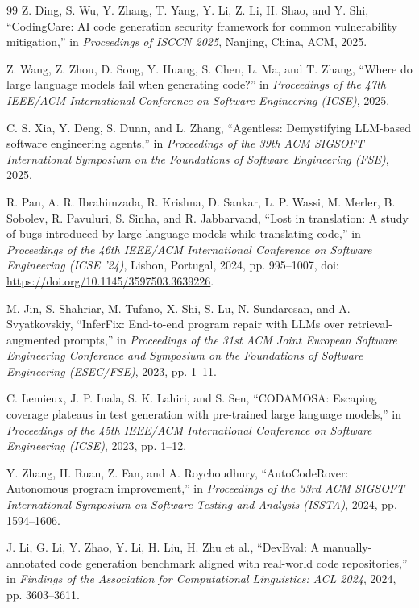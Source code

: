 \documentclass[10pt,a4paper]{article}
\begin{document}
\begin{thebibliography}{99}
Z. Ding, S. Wu, Y. Zhang, T. Yang, Y. Li, Z. Li, H. Shao, and Y. Shi, ``CodingCare: AI code generation security framework for common vulnerability mitigation,'' in \textit{Proceedings of ISCCN 2025}, Nanjing, China, ACM, 2025.

Z. Wang, Z. Zhou, D. Song, Y. Huang, S. Chen, L. Ma, and T. Zhang, ``Where do large language models fail when generating code?'' in \textit{Proceedings of the 47th IEEE/ACM International Conference on Software Engineering (ICSE)}, 2025.

C. S. Xia, Y. Deng, S. Dunn, and L. Zhang, ``Agentless: Demystifying LLM-based software engineering agents,'' in \textit{Proceedings of the 39th ACM SIGSOFT International Symposium on the Foundations of Software Engineering (FSE)}, 2025.

R. Pan, A. R. Ibrahimzada, R. Krishna, D. Sankar, L. P. Wassi, M. Merler, B. Sobolev, R. Pavuluri, S. Sinha, and R. Jabbarvand, ``Lost in translation: A study of bugs introduced by large language models while translating code,'' in \textit{Proceedings of the 46th IEEE/ACM International Conference on Software Engineering (ICSE '24)}, Lisbon, Portugal, 2024, pp. 995--1007, doi: \url{https://doi.org/10.1145/3597503.3639226}.

M. Jin, S. Shahriar, M. Tufano, X. Shi, S. Lu, N. Sundaresan, and A. Svyatkovskiy, ``InferFix: End-to-end program repair with LLMs over retrieval-augmented prompts,'' in \textit{Proceedings of the 31st ACM Joint European Software Engineering Conference and Symposium on the Foundations of Software Engineering (ESEC/FSE)}, 2023, pp. 1--11.

C. Lemieux, J. P. Inala, S. K. Lahiri, and S. Sen, ``CODAMOSA: Escaping coverage plateaus in test generation with pre-trained large language models,'' in \textit{Proceedings of the 45th IEEE/ACM International Conference on Software Engineering (ICSE)}, 2023, pp. 1--12.

Y. Zhang, H. Ruan, Z. Fan, and A. Roychoudhury, ``AutoCodeRover: Autonomous program improvement,'' in \textit{Proceedings of the 33rd ACM SIGSOFT International Symposium on Software Testing and Analysis (ISSTA)}, 2024, pp. 1594--1606.

J. Li, G. Li, Y. Zhao, Y. Li, H. Liu, H. Zhu et al., ``DevEval: A manually-annotated code generation benchmark aligned with real-world code repositories,'' in \textit{Findings of the Association for Computational Linguistics: ACL 2024}, 2024, pp. 3603--3611.


\end{thebibliography}
\end{document}
